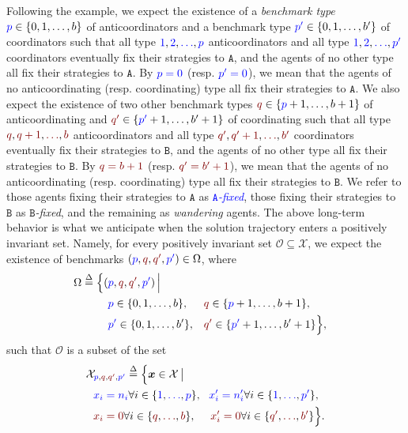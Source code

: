 \documentclass[10 pt,twocolumn,journal]{IEEEtran}
\theoremstyle{plain}
\newcommand{\db}{\overset{\Delta}{=}}
\newcommand{\A}{\mathcal{A}}
\renewcommand{\O}{\mathcal{O}}
\newcommand{\X}{\mathcal{X}}
\newcommand{\x}{\bm{x}}
\newcommand{\p}{\tb{p}}
\newcommand{\pp}{\tb{p'}}
\newcommand{\q}{\tr{q}}
\newcommand{\qq}{\tr{q'}}
\renewcommand{\A}{\mathtt{A}}
\newcommand{\B}{\mathtt{B}}
\newcommand{\tb}{\textcolor{blue}}
\newcommand{\tr}{\textcolor{Myred}}
\newcommand{\tg}{\textcolor{Mygreen}}
\theoremstyle{definition}
\begin{document}
Following the example, we expect the existence of a \emph{benchmark type} $\p\in\{0,1,\ldots,b\}$ of anticoordinators and a benchmark type $\pp\in\{0,1,\ldots,b'\}$ of coordinators such that all type $\tb{1},\tb{2}, \tb{\ldots},\p$ anticoordinators and all type $\tb{1},\tb{2},\tb{\ldots}, \pp$ coordinators eventually fix their strategies to $\A$, and the agents of no other type all fix their strategies to $\A$.
By $\tb{\p = 0}$ (resp. $\tb{\pp = 0}$), we mean that the agents of no anticoordinating (resp. coordinating) type all fix their strategies to $\A$. 
We also expect the existence of two other benchmark types $\q\in\{\p+1,\ldots,b+1\}$ of anticoordinating and $\qq\in\{\pp +1,\ldots,b'+1\}$ of coordinating such that all type $\q,\tr{\q+1},\tr{\ldots},\tr{b}$ anticoordinators and all type $\qq, \tr{\qq+1},\tr{\ldots}, \tr{b'}$ coordinators eventually fix their strategies to $\B$, and the agents of no other type all fix their strategies to $\B$.
By $\tr{\q = b+1}$ (resp. $\tr{\qq = b'+1}$), we mean that the agents of no anticoordinating (resp. coordinating) type all fix their strategies to $\B$. 
We refer to those agents fixing their strategies to $\A$ as \tb{\emph{$\A$-fixed}}, those fixing their strategies to $\B$ as \tr{\emph{$\B$-fixed}}, and the remaining as \tg{\emph{wandering}} agents.
The above long-term behavior is what we anticipate when the solution trajectory enters a positively invariant set.
Namely, for every positively invariant set $\O\subseteq \X$, we expect the existence of benchmarks $(\tb{p},\tr{q},\tr{\qq },\tb{\pp })\in\Omega$, where
\begin{align*}
    \Omega
    \db \Big\{(&\tb{p},\tr{q},\tr{\qq },\tb{\pp })\,\Big|\,  \\
    &\tb{p}\in\{0,1,\ldots,b\}, &&\tr{q}\in\{\tb{p}+1,\ldots,b+1\},\\
    &\tb{\pp }\in\{0,1,\ldots,b'\}, &&\tr{\qq }\in\{\pp +1,\ldots,b'+1\} \Big\},
\end{align*}
such that $\O$ is a subset of the set
\begin{align*}
	&\X_{\tb{p},\tr{q},\tr{\qq },\tb{\pp }}
    \db \Big\{ 
    	\x \in \X\, \big|\, \nonumber \\
        	&\ \ \tb{x_i = n_i} \forall i\in\{\tb{1},\tb{\ldots},\tb{p}\}, 
        	\ \ \tb{x'_i = n'_i} \forall i\in\{\tb{1},\tb{\ldots},\tb{\pp }\}, \nonumber\\
            &\ \ \tr{x_i = 0} \forall i\in\{\tr{q},\tr{\ldots},\tr{b}\}, 
            \ \ \ \ \tr{x'_i = 0} \forall i\in\{\tr{\qq },\tr{\ldots},\tr{b'}\}
            \Big\}. \label{eq:I_1}%
\end{align*}
\end{document}
